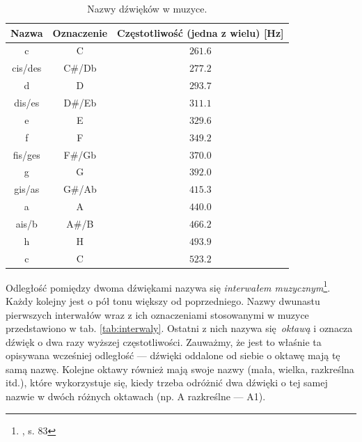 \begin{table}[htb]
    \centering
    \caption{Nazwy dźwięków w muzyce.}
    \label{tab:nazwy_dzwiekow}
    \begin{tabular}{|c|c|c|} \hline
        Nazwa & Oznaczenie & Częstotliwość (jedna z wielu) [Hz] \\ \hline
        c       & C     & $261.6$  \\
        cis/des & C\#/Db & $277.2$  \\
        d       & D     & $293.7$  \\
        dis/es  & D\#/Eb & $311.1$  \\
        e       & E     & $329.6$  \\
        f       & F     & $349.2$  \\
        fis/ges & F\#/Gb & $370.0$  \\
        g       & G     & $392.0$  \\
        gis/as  & G\#/Ab & $415.3$  \\
        a       & A     & $440.0$  \\
        ais/b   & A\#/B  & $466.2$  \\
        h       & H     & $493.9$  \\
        c       & C     & $523.2$  \\ \hline
    \end{tabular}
\end{table}

Odległość pomiędzy dwoma dźwiękami nazywa się \emph{interwałem muzycznym}\footnote{\cite{lerch_introduction_2012}, s.  83}. Każdy kolejny jest o pół tonu większy od poprzedniego. Nazwy dwunastu pierwszych interwałów wraz z ich oznaczeniami stosowanymi w muzyce przedstawiono w tab. \ref{tab:interwaly}. Ostatni z nich nazywa się \emph{oktawą} i oznacza dźwięk o dwa razy wyższej częstotliwości. Zauważmy, że jest to właśnie ta opisywana wcześniej odległość --- dźwięki oddalone od siebie o oktawę mają tę samą nazwę.  Kolejne oktawy również mają swoje nazwy (mała, wielka, razkreślna itd.), które wykorzystuje się, kiedy trzeba odróżnić dwa dźwięki o tej samej nazwie w dwóch różnych oktawach (np. A razkreślne --- A1).

